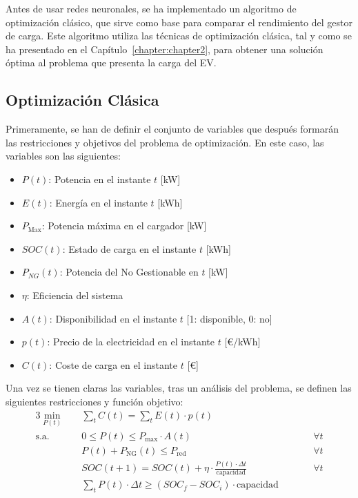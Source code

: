 Antes de usar redes neuronales, se ha implementado un algoritmo de optimización clásico, que
sirve como base para comparar el rendimiento del gestor de carga. Este algoritmo utiliza las 
técnicas de optimización clásica, tal y como se ha presentado en el Capítulo~\ref{chapter:chapter2}, 
para obtener una solución óptima al problema que presenta la carga del EV.\\

\subsection{Optimización Clásica}
Primeramente, se han de definir el conjunto de variables que después formarán las restricciones y
objetivos del problema de optimización. En este caso, las variables son las siguientes:
\begin{itemize}
    \item $\mathit{P}(t)$: Potencia en el instante $t$ [kW]
    \item $\mathit{E}(t)$: Energía en el instante $t$ [kWh]
    \item $P_\text{Max}$: Potencia máxima en el cargador [kW]
    \item $\mathit{SOC}(t)$: Estado de carga en el instante $t$ [kWh]
    \item $P_{NG}(t)$: Potencia del No Gestionable en $t$ [kW]
    \item $\eta$: Eficiencia del sistema
    \item $A(t)$: Disponibilidad en el instante $t$ [1: disponible, 0: no]
    \item $p(t)$: Precio de la electricidad en el instante $t$ [€/kWh]
    \item $C(t)$: Coste de carga en el instante $t$ [€]
\end{itemize}

Una vez se tienen claras las variables, tras un análisis del problema, se definen las siguientes
restricciones y función objetivo:
\begin{alignat}{3}
    \min_{P(t)} \quad & \sum_{t} C(t) = \sum_{t} E(t) \cdot p(t) && \\
    \text{s.a.} \quad 
    & 0 \leq P(t) \leq P_{\text{max}} \cdot A(t) && \qquad \forall t \\
    & P(t) + P_{\text{NG}}(t) \leq P_{\text{red}} && \qquad \forall t \\
    & SOC(t+1) = SOC(t) + \eta \cdot \frac{P(t) \cdot \Delta t}{\text{capacidad}} && \qquad \forall t \\
    & \sum_{t} P(t) \cdot \Delta t \geq (SOC_f - SOC_i) \cdot \text{capacidad} &&
\end{alignat}
 
